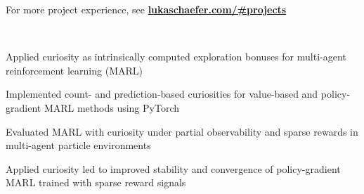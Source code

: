 \documentclass[]{lukas-cv-openfont}
\begin{document}


\vspace{-.2em}

\begin{flushleft}
    For more project experience, see \href{https://www.lukaschaefer.com/#projects}{\textbf{lukaschaefer.com/\#projects}}
\end{flushleft}
\sectionsep



\noindent
{}
\\
\begin{tightitemize}{1.7em}
    \item Applied curiosity as intrinsically computed exploration bonuses for multi-agent reinforcement learning (MARL)
    \item Implemented count- and prediction-based curiosities for value-based and policy-gradient MARL methods using PyTorch
    \item Evaluated MARL with curiosity under partial observability and sparse rewards in multi-agent particle environments
    \item Applied curiosity led to improved stability and convergence of policy-gradient MARL trained with sparse reward signals
\end{tightitemize}
\largesectionsep
\end{document}
